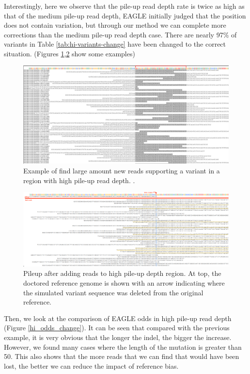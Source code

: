 Interestingly, here we observe that the pile-up read depth rate is twice as high as that of the medium pile-up read depth, EAGLE initially judged that the position does not contain variation, but through our method we can complete more corrections than the medium pile-up read depth case. There are nearly 97\% of variants in Table \ref{tab:hi-variants-change} have been changed to the correct situation. (Figures \ref{hi_new_REFread},\ref{hi_pileup_REFread} show some examples)

\begin{figure}[H]
\includegraphics[width=1\columnwidth]{body/image/hi_new_REFread.png}
\caption[New reads in a region with high pile-up read depth]%
{Example of find large amount new reads supporting a variant in a region with high pile-up read depth.
\ExplainRedBracket.}
\label{hi_new_REFread}
\end{figure}

\begin{figure}[H]
\includegraphics[width=1\columnwidth]{body/image/hi_pileup_REFread.png}
\caption[variant pileup in high pile-up read depth]
{Pileup after adding reads to high pile-up depth region.
At top, the doctored reference genome is shown with an arrow indicating where the simulated variant sequence was deleted from the original reference.}
\label{hi_pileup_REFread}
\end{figure}

Then, we look at the comparison of EAGLE odds in high pile-up read depth (Figure \ref{hi_odds_change}). It can be seen that compared with the previous example, it is very obvious that the longer the indel, the bigger the increase. However, we found many cases where the length of the mutation is greater than 50. This also shows that the more reads that we can find that would have been lost, the better we can reduce the impact of reference bias.

